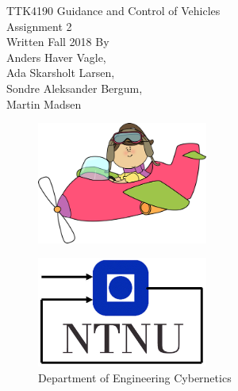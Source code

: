\documentclass[a4paper]{article}
\begin{document}
\begin{titlepage}
\begin{center}
\Large TTK4190 Guidance and Control of Vehicles \\
\vspace{10pt}
\Large  Assignment 2 \\
\vspace{10pt}
\large Written Fall 2018 By \\
\large Anders Haver Vagle,\\ Ada Skarsholt Larsen,\\ Sondre Aleksander Bergum,\\ Martin Madsen
\begin{figure}[h]
\centering
\includegraphics[width=0.5\textwidth]{flying-plane-clipart.jpg}
\end{figure}

\begin{figure}[b]
\centering
\includegraphics[width=0.5\textwidth]{itk_ntnu}\\
Department of Engineering Cybernetics
\end{figure}
\end{center}
\end{titlepage}




 
%
%
\end{document}
